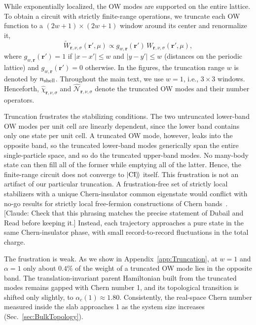 \documentclass[aps,prb,10pt,twocolumn,superscriptaddress,longbibliography,floatfix]{revtex4-2}
\newcommand{\mc}[1]{\mathcal{#1}}
\newcommand{\mr}[1]{\mathrm{#1}}
\newcommand{\bfr}{\boldsymbol r}
\newcommand{\kett}[1]{\ket{#1}\!\rangle}
\newcommand{\CI}{\kett{\mr{CI}}}
\newcommand{\newtext}[1]{{\color{blue}#1}}
\newcommand{\claudeadd}[1]{{\color{orange}#1}}
\newcommand{\claudecom}[1]{{\color{ForestGreen}[Claude: #1]}}
\begin{document}
\label{sec:TruncatedOW}
While exponentially localized, the OW modes are supported on the entire lattice. To obtain a circuit with strictly finite-range operations, we truncate each OW function to a $(2w+1)\times(2w+1)$ window around its center and renormalize it,
\begin{equation}
    \widetilde W_{\bfr,\nu,\sigma}(\bfr',\mu)\propto g_{w,\bfr}(\bfr')\,W_{\bfr,\nu,\sigma}(\bfr',\mu),
    \label{eq:TruncatedOW}
\end{equation}
where $g_{w,\bfr}(\bfr')=1$ if $|x-x'|\leq w$ and $|y-y'|\leq w$ (distances on the periodic lattice) and $g_{w,\bfr}(\bfr')=0$ otherwise. In the figures, the truncation range $w$ is denoted by $n_{\rm shell}$. Throughout the main text, we use $w=1$, i.e., $3\times3$ windows. Henceforth, $\hat\chi_{\bfr,\nu,\sigma}$ and $\hat{\mc N}_{\bfr,\nu,\sigma}$ denote the truncated OW modes and their number operators.

Truncation frustrates the stabilizing conditions. The two untruncated lower-band OW modes per unit cell are linearly dependent, since the lower band contains only one state per unit cell. A truncated OW mode, however, leaks into the opposite band, so the truncated lower-band modes generically span the entire single-particle space, and so do the truncated upper-band modes. No many-body state can then fill all of the former while emptying all of the latter. Hence, the finite-range circuit does not converge to $\CI$ itself. \claudeadd{This frustration is not an artifact of our particular truncation. A frustration-free set of strictly local stabilizers with a unique Chern-insulator common eigenstate would conflict with no-go results for strictly local free-fermion constructions of Chern bands~\cite{DubailRead2015}.} \claudecom{Check that this phrasing matches the precise statement of Dubail and Read before keeping it.} Instead, each trajectory approaches a pure state in the same Chern-insulator phase, with small record-to-record fluctuations in the total charge.

The frustration is weak. As we show in Appendix~\ref{app:Truncation}, at $w=1$ and $\alpha=1$ only about $0.4\%$ of the weight of a truncated OW mode lies in the opposite band. The translation-invariant parent Hamiltonian built from the truncated modes remains gapped with Chern number 1, and its topological transition is shifted only slightly, to $\alpha_c(1)\approx1.80$. \newtext{Consistently, the real-space Chern number measured inside the slab approaches 1 as the system size increases (Sec.~\ref{sec:BulkTopology}).}
\end{document}
